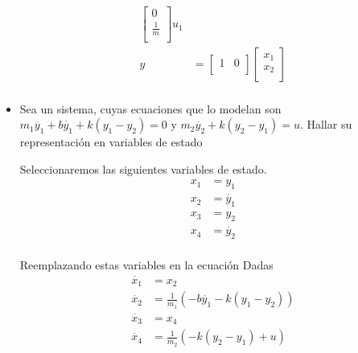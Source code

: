 \documentclass[12pt]{article}
\begin{document}
\begin{itemize}
\begin{equation}
\begin{split}
\begin{bmatrix}
                0 \\
                \frac{1}{m} \\
            \end{bmatrix}u_{1}\\
            y&=
            \begin{bmatrix}
                1 & 0\\
            \end{bmatrix}
            \begin{bmatrix}
                x_{1} \\
                x_{2} \\
            \end{bmatrix}\\
        \label{eq:state_ejem12}
        \end{split}
    \end{equation}

    \item Sea un sistema, cuyas ecuaciones que lo modelan son $m_{1}\ddot{y_{1}}+b\dot{y_{1}}+k(y_{1}-y_{2})=0$ y $m_{2}\ddot{y_{2}}+k(y_{2}-y_{1})=u$. Hallar su representación en variables de estado
    
    Seleccionaremos las siguientes variables de estado.
    \begin{equation}
        \begin{split}
        x_{1}&=y_{1}\\
        x_{2}&=\dot{y_{1}}\\
        x_{3}&=y_{2}\\
        x_{4}&=\dot{y_{2}}\\
        \label{eq:state_ejem2}
        \end{split}
    \end{equation}

    Reemplazando estas variables en la ecuación Dadas
    \begin{equation}
        \begin{split}
        \dot{x_{1}}&=x_{2}\\
        \dot{x_{2}}&=\frac{1}{m_{1}}(-b\dot{y_{1}}-k(y_{1}-y_{2}))\\
        \dot{x_{3}}&=x_{4}\\
        \dot{x_{4}}&=\frac{1}{m_{2}}(-k(y_{2}-y_{1})+u)\\
        \label{eq:state_ejem21}
        \end{split}
    \end{equation}


\end{itemize}
\end{document}
